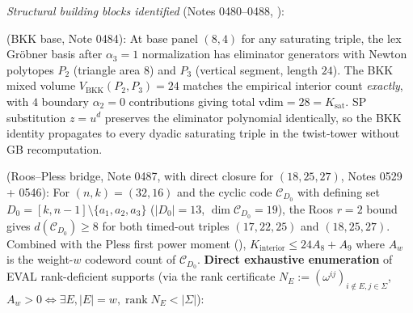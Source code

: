 \documentclass[11pt]{article}
\theoremstyle{definition}
\theoremstyle{remark}
\begin{document}
\emph{Structural building blocks identified} (Notes 0480--0488,
\cite{CompanionRepo}):

(BKK base, Note 0484): At base panel $(8, 4)$ for any saturating triple,
the lex Gröbner basis after $\alpha_3 = 1$ normalization has eliminator
generators with Newton polytopes $P_2$ (triangle area $8$) and $P_3$
(vertical segment, length $24$). The BKK mixed volume
$V_{\mathrm{BKK}}(P_2, P_3) = 24$ matches the empirical interior count
\emph{exactly}, with $4$ boundary $\alpha_2 = 0$ contributions giving
total $\mathrm{vdim} = 28 = K_{\mathrm{sat}}$. SP substitution $z = u^d$
preserves the eliminator polynomial identically, so the BKK identity
propagates to every dyadic saturating triple in the twist-tower without
GB recomputation.

(Roos--Pless bridge, Note 0487, with direct closure for $(18, 25, 27)$,
Notes 0529 + 0546):
For $(n, k) = (32, 16)$ and the cyclic code $\mathcal{C}_{D_0}$ with
defining set $D_0 = [k, n-1] \setminus \{a_1, a_2, a_3\}$ ($|D_0| = 13$,
$\dim \mathcal{C}_{D_0} = 19$), the Roos $r=2$ bound
\cite{Roos1983, HartmannTzeng1972} gives $d(\mathcal{C}_{D_0})
\geq 8$ for both timed-out triples $(17, 22, 25)$ and $(18, 25, 27)$.
Combined with the Pless first power moment
(\cite[Ch.~5]{MacWilliamsSloane1977}),
$K_{\text{interior}} \leq 24 A_8 + A_9$
where $A_w$ is the weight-$w$ codeword count of $\mathcal{C}_{D_0}$.
\textbf{Direct exhaustive enumeration} of EVAL rank-deficient supports
(via the rank certificate
$N_E := (\omega^{ij})_{i \notin E, j \in \Sigma}$,
$A_w > 0 \iff \exists E, |E| = w, \operatorname{rank} N_E < |\Sigma|$):
\end{document}
